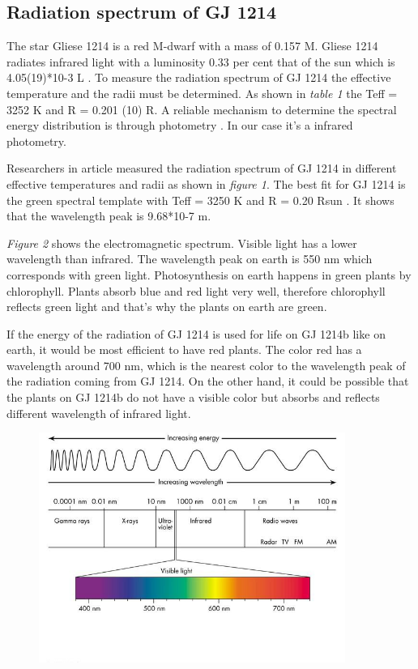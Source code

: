 \documentclass[12pt,a4paper]{article}
\begin{document}

\subsection{Radiation spectrum of GJ 1214}
The star Gliese 1214 is a red M-dwarf with a mass of 0.157 M. Gliese 1214 radiates infrared light with a luminosity 0.33 per cent that of the sun which is 4.05(19)*10-3 L \cite{Anglada_2013}. To measure the radiation spectrum of GJ 1214 the effective temperature and the radii must be determined. As shown in \textit{table 1} the Teff = 3252 K and R = 0.201 (10) R. A reliable mechanism to determine the spectral energy distribution is through photometry \cite{Anglada_2013}. In our case it’s a infrared photometry. 

Researchers in article \cite{Anglada_2013} measured the radiation spectrum of GJ 1214 in different effective temperatures and radii as shown in \textit{figure 1}. The best fit for GJ 1214 is the green spectral template with Teff = 3250 K and R = 0.20 Rsun \cite{Anglada_2013}. It shows that the wavelength peak is 9.68*10-7 m. 

\textit{Figure 2} shows the electromagnetic spectrum. Visible light has a lower wavelength than infrared. The wavelength peak on earth is 550 nm which corresponds with green light. Photosynthesis on earth happens in green plants by chlorophyll. Plants absorb blue and red light very well, therefore chlorophyll reflects green light \cite{ijms15034657} and that’s why the plants on earth are green. 

If the energy of the radiation of GJ 1214 is used for life on GJ 1214b like on earth, it would be most efficient to have red plants. The color red has a wavelength around 700 nm, which is the nearest color to the wavelength peak of the radiation coming from GJ 1214. 
On the other hand, it could be possible that the plants on GJ 1214b do not have a visible color but absorbs and reflects different wavelength of infrared light. 

\begin{figure}
  \includegraphics[width=100mm]{EMSpectrumcolor.jpg}\\   
  \vspace{-13ex}
  \label{fig:Electromagnetic spectrum}
 \end{figure}





\end{document}

